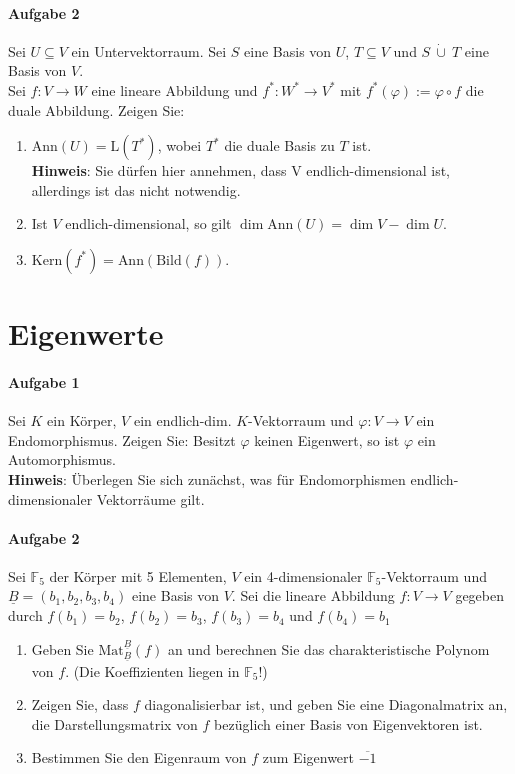 \documentclass{scrartcl}
\begin{document}
	\paragraph{Aufgabe 2}
	Sei $U\subseteq V$ ein Untervektorraum. Sei $S$ eine Basis von $U$, $T\subseteq V$ und $S\ \dot\cup\ T$ eine Basis von $V$.\\
	Sei $f: V\to W$ eine lineare Abbildung und $f^*: W^*\to V^*$
	mit $f^*(\varphi):=\varphi\circ f$ die duale Abbildung. Zeigen Sie:
	\begin{enumerate}[label=(\alph*)]
		\item $\text{Ann}(U)=\text{L}(T^*)$, wobei $T^*$ die duale Basis zu $T$ ist.\\
		\textbf{Hinweis}: Sie dürfen hier annehmen, dass V endlich-dimensional ist,
		allerdings ist das nicht notwendig.
		\item Ist $V$ endlich-dimensional, so gilt $\dim \text{Ann}(U)=\dim V-\dim U$.
		\item $\text{Kern}(f^*)=\text{Ann}(\text{Bild}(f))$.
	\end{enumerate}
	\section{Eigenwerte}
	\paragraph{Aufgabe 1}
	Sei $K$ ein Körper, $V$ ein endlich-dim. $K$-Vektorraum und $\varphi:V\to V$ ein Endomorphismus.
	Zeigen Sie: Besitzt $\varphi$ keinen Eigenwert, so ist $\varphi$ ein Automorphismus.\\
	\textbf{Hinweis}: Überlegen Sie sich zunächst,
	was für Endomorphismen endlich-dimensionaler Vektorräume gilt.
	\paragraph{Aufgabe 2}
	Sei $\mathbb{F}_5$ der Körper mit 5 Elementen,
	$V$ ein 4-dimensionaler $\mathbb{F}_5$-Vektorraum
	und $\underline{B}=(b_1,b_2,b_3,b_4)$ eine Basis von $V$.
	Sei die lineare Abbildung $f: V\to V$ gegeben
	durch $f(b_1)=b_2$, $f(b_2)=b_3$, $f(b_3)=b_4$ und $f(b_4)=b_1$
	\begin{enumerate}[label=(\alph*)]
		\item Geben Sie $\text{Mat}_{\underline{B}}^{\underline{B}}(f)$ an
			und berechnen Sie das charakteristische Polynom von $f$.
			(Die Koeffizienten liegen in $\mathbb{F}_5$!)
		\item Zeigen Sie, dass $f$ diagonalisierbar ist,
			und geben Sie eine Diagonalmatrix an, die Darstellungsmatrix von $f$
			bezüglich einer Basis von Eigenvektoren ist.
		\item Bestimmen Sie den Eigenraum von $f$ zum Eigenwert $\overline{-1}$
	\end{enumerate}
\end{document}
